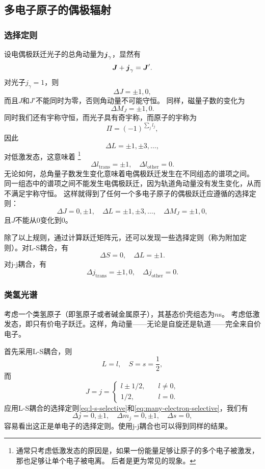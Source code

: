 \subsection{多电子原子的偶极辐射}

\subsubsection{选择定则}

设电偶极跃迁光子的总角动量为$\vb*{j}_\gamma$，显然有
\[
    \vb*{J} + \vb*{j}_\gamma = \vb*{J}'.
\]
对光子$j_\gamma=1$，则
\[
    \Delta J = \pm 1, 0, 
\]
而且$J$和$J'$不能同时为零，否则角动量不可能守恒。
同样，磁量子数的变化为
\[
    \Delta M_J = \pm 1, 0.
\]
同时我们还有宇称守恒，而光子具有奇宇称，而原子的宇称为
\[
    \Pi = (-1)^{\sum_{j} l_j},
\]
因此
\[
    \Delta L = \pm 1, \pm 3, \ldots,
\]
对低激发态，这意味着%
\footnote{通常只考虑低激发态的原因是，如果一份能量足够让原子的多个电子被激发，那也足够让单个电子被电离。
后者是更为常见的现象。}%
\[
    \Delta l_\text{trans} = \pm 1, \quad \Delta l_\text{other} = 0.
\]
无论如何，总角量子数发生变化意味着电偶极跃迁发生在不同组态的谱项之间。
同一组态中的谱项之间不能发生电偶极跃迁，因为轨道角动量没有发生变化，从而不满足宇称守恒。
这样就得到了任何一个多电子原子的偶极跃迁应遵循的选择定则：
\begin{equation}
    \Delta J = 0, \pm 1, \quad \Delta L = \pm 1, \pm 3, \ldots, \quad \Delta M_J = \pm 1, 0,
    \label{eq:many-electron-selective}
\end{equation}
且$J$不能从0变化到0。

除了以上规则，通过计算跃迁矩阵元，还可以发现一些选择定则（称为附加定则）。对L-S耦合，有
\begin{equation}
    \Delta S = 0, \quad \Delta L = \pm 1.
    \label{eq:l-s-selective}
\end{equation}
对j-j耦合，有
\begin{equation}
    \Delta j_\text{trans} = \pm 1, 0, \quad \Delta j_\text{other} = 0.
    \label{eq:j-j-selective}
\end{equation}

\subsubsection{类氢光谱}

考虑一个类氢原子（即氢原子或者碱金属原子），其基态价壳组态为$n$s。
考虑低激发态，即只有价电子跃迁。这样，角动量——无论是自旋还是轨道——完全来自价电子。

首先采用L-S耦合，则
\[
    L = l, \quad S = s = \frac{1}{2}, 
\]
而
\[
    J = j = \begin{cases}
        l \pm 1/2, &\quad l \neq 0, \\
        1/2, &\quad l = 0.
    \end{cases}
\]
应用L-S耦合的选择定则\eqref{eq:l-s-selective}和\eqref{eq:many-electron-selective}，我们有
\[
    \Delta j = 0, \pm 1, \quad \Delta m_j = 0, \pm 1, \quad \Delta s = 0, 
\]
容易看出这正是单电子的选择定则。使用j-j耦合也可以得到同样的结果。

